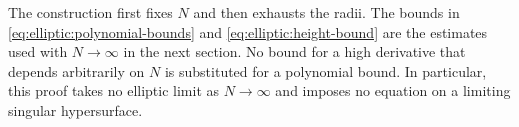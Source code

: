\begin{remark}\label{rem:elliptic:limit-order}
The construction first fixes $N$ and then exhausts the radii.
The bounds in \eqref{eq:elliptic:polynomial-bounds} and
\eqref{eq:elliptic:height-bound} are the estimates used with $N\to\infty$
in the next section.  No bound for a high derivative that depends
arbitrarily on $N$ is substituted for a polynomial bound.  In
particular, this proof takes no elliptic limit as $N\to\infty$ and
imposes no equation on a limiting singular hypersurface.
\end{remark}
